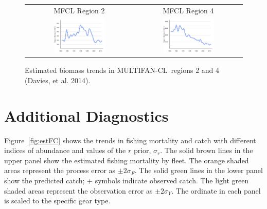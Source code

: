\documentclass[12pt,letterpaper]{article}
\newcommand\MFCL{MULTIFAN-CL}
\begin{document}
\begin{figure}
\begin{center}
{\scriptsize \sffamily
\begin{tabular}{cc}
MFCL Region 2 & MFCL Region 4\\
\includegraphics[width=0.50\textwidth]{./annual_region_2_biomass.pdf} &
\includegraphics[width=0.50\textwidth]{./annual_region_4_biomass.pdf} \\
\end{tabular}
}
\end{center}
\caption{Estimated biomass trends in \MFCL\ regions 2 and 4 (Davies, et al. 2014).
\label{fig:mfclbiomass}
}
\end{figure}

\clearpage
\section{Additional Diagnostics}
\label{sec:diagnostics}

Figure~\ref{fig:estFC} shows the trends in fishing mortality and
catch with different indices of abundance and values of the $r$
prior, $\sigma_r$.
The solid brown lines in the upper panel show the estimated fishing
mortality by fleet. The orange shaded areas represent the process
error as $\pm 2\sigma_F$.
The solid green lines in the lower panel show the predicted catch; $+$
symbols indicate observed catch. 
The light green shaded areas represent the observation error as 
$\pm 2\sigma_Y$.
The ordinate in each panel is scaled to the specific gear type.
\end{document}

